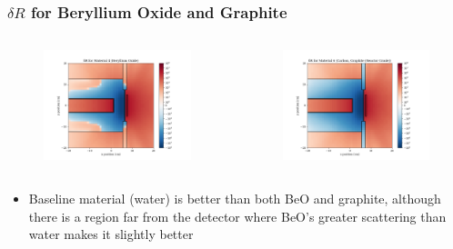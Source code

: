 \documentclass[t]{beamer}
\begin{document}
\begin{frame}
  \frametitle{$\delta R$ for Beryllium Oxide and Graphite}
  \vskip-0.3in
  \begin{columns}
    \begin{figure}
      \includegraphics[trim={0.7in 0.15in 1.05in 0.4in},clip,scale=0.36]{images/dR_04.png}
    \end{figure}
    \begin{figure}
      \includegraphics[trim={0.7in 0.15in 1.05in 0.4in},clip,scale=0.36]{images/dR_06.png}
    \end{figure}
  \end{columns}
  \begin{itemize}
    \item Baseline material (water) is better than both BeO and graphite,
          although there is a region far from the detector where BeO's greater
          scattering than water makes it slightly better
  \end{itemize}
\end{frame}
\end{document}

